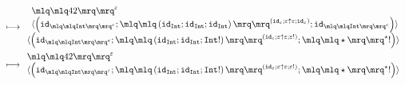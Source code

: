 \documentclass{article}
\begin{document}
\begin{align*}
\longmapsto &\;\begin{array}{l}\begin{array}{l}\quot{42}^{\varepsilon}\\\langle\left(\mathtt{id}_{\quot{\mathtt{Int}}^{\varepsilon}};\quot{\left(\mathtt{id}_{\mathtt{Int}};\mathtt{id}_{\mathtt{Int}};\mathtt{id}_{\mathtt{Int}}\right)}^{\left(\mathtt{id}_{\varepsilon};\varepsilon \uparrow \varepsilon;\mathtt{id}_{\varepsilon}\right)};\mathtt{id}_{\quot{\mathtt{Int}}^{\varepsilon}}\right)\rangle\end{array}\\\langle\left(\mathtt{id}_{\quot{\mathtt{Int}}^{\varepsilon}};\quot{\left(\mathtt{id}_{\mathtt{Int}};\mathtt{id}_{\mathtt{Int}};\mathtt{Int}!\right)}^{\left(\mathtt{id}_{\varepsilon};\varepsilon \uparrow \varepsilon;\varepsilon!\right)};\quot{\star}^{\star}!\right)\rangle\end{array}\\ 
\longmapsto &\;\begin{array}{l}\quot{42}^{\varepsilon}\\\langle\left(\mathtt{id}_{\quot{\mathtt{Int}}^{\varepsilon}};\quot{\left(\mathtt{id}_{\mathtt{Int}};\mathtt{id}_{\mathtt{Int}};\mathtt{Int}!\right)}^{\left(\mathtt{id}_{\varepsilon};\varepsilon \uparrow \varepsilon;\varepsilon!\right)};\quot{\star}^{\star}!\right)\rangle\end{array}\\ 
\end{align*}
\end{document}
